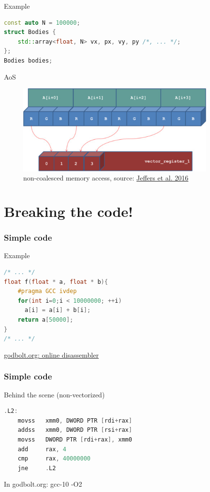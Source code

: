 \documentclass{beamer}
\begin{document}
\begin{frame}[fragile]
\begin{block}{Example}

\begin{lstlisting}[language=C++, caption={SoA}]
const auto N = 100000;
struct Bodies {
    std::array<float, N> vx, px, vy, py /*, ... */;
};
Bodies bodies;
\end{lstlisting}
\end{block}
\end{frame}

\begin{frame}{AoS}
    \begin{figure}
        \centering
        \includegraphics[width=10cm]{image/AoS.jpg}
        \caption{non-coalesced memory access, source: \href{run: https://www.sciencedirect.com/science/article/pii/B9780128091944000119}{Jeffers et al. 2016}}
        \label{fig:aos-memory}
    \end{figure}
\end{frame}
\section{Breaking the code!}

\begin{frame}[fragile]
\frametitle{Simple code}
\begin{block}{Example}
\begin{lstlisting}[language=C++, caption={Vectorization example}]
/* ... */
float f(float * a, float * b){
    #pragma GCC ivdep
    for(int i=0;i < 10000000; ++i)
      a[i] = a[i] + b[i];
    return a[50000];
}
/* ... */
\end{lstlisting}
\end{block}
\href{run:http://www.godbolt.org}{godbolt.org: online disassembler}
\end{frame}

\begin{frame}[fragile]
\frametitle{Simple code}
\begin{block}{Behind the scene (non-vectorized)}
\begin{lstlisting}[language=C++, caption={Vectorization example}]
.L2:
    movss   xmm0, DWORD PTR [rdi+rax]
    addss   xmm0, DWORD PTR [rsi+rax]
    movss   DWORD PTR [rdi+rax], xmm0
    add     rax, 4
    cmp     rax, 40000000
    jne     .L2
\end{lstlisting}

\end{block}
In godbolt.org: gcc-10 -O2
\end{frame}
\end{document}
